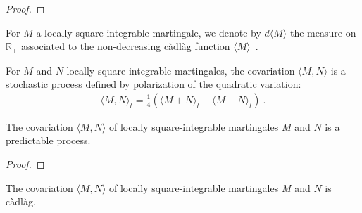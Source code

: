 \begin{proof}

\end{proof}


\begin{definition}\label{def:quadraticVariationMeasure}
For $M$ a locally square-integrable martingale, we denote by $d\langle M \rangle$ the measure on
$\mathbb{R}_+$ associated to the non-decreasing càdlàg function $\langle M \rangle$~.
\end{definition}


\begin{definition}[Covariation]\label{def:covariation}
For $M$ and $N$ locally square-integrable martingales, the covariation
$\langle M, N \rangle$ is a stochastic process defined by polarization of the quadratic variation:
\begin{align*}
  \langle M, N \rangle_t = \frac{1}{4}\left(\langle M+N \rangle_t - \langle M-N \rangle_t \right)
  \: .
\end{align*}

\end{definition}


\begin{lemma}\label{lem:predictable_covariation}
The covariation $\langle M, N \rangle$ of locally square-integrable martingales $M$ and $N$ is a
predictable process.
\end{lemma}

\begin{proof}

\end{proof}


\begin{lemma}\label{lem:cadlag_covariation}
The covariation $\langle M, N \rangle$ of locally square-integrable martingales $M$ and $N$ is
càdlàg.
\end{lemma}

